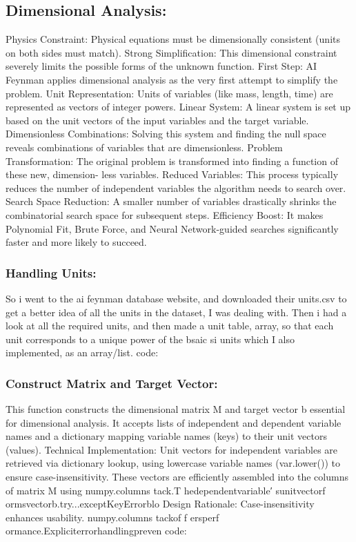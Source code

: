 \documentclass{article}
\begin{document}
\subsection{Dimensional Analysis: }

Physics Constraint: Physical equations must be dimensionally consistent (units on both sides must match).
Strong Simplification: This dimensional constraint severely limits the possible forms of the unknown function.
First Step: AI Feynman applies dimensional analysis as the very first attempt to simplify the problem.
Unit Representation: Units of variables (like mass, length, time) are represented as vectors of integer powers.
Linear System: A linear system is set up based on the unit vectors of the input variables and the target variable.
Dimensionless Combinations: Solving this system and finding the null space reveals combinations of variables
that are dimensionless.
Problem Transformation: The original problem is transformed into finding a function of these new, dimension-
less variables.
Reduced Variables: This process typically reduces the number of independent variables the algorithm needs to
search over.
Search Space Reduction: A smaller number of variables drastically shrinks the combinatorial search space for
subsequent steps.
Efficiency Boost: It makes Polynomial Fit, Brute Force, and Neural Network-guided searches significantly
faster and more likely to succeed. 


\subsubsection{Handling Units:}

So i went to the ai feynman database website, and downloaded their units.csv to get a better idea of all the units
in the dataset, I was dealing with. Then i had a look at all the required units, and then made a unit table, array,
so that each unit corresponds to a unique power of the bsaic si units which I also implemented, as an array/list.
code: \\


\subsubsection{Construct Matrix and Target Vector:}

This function constructs the dimensional matrix M and target vector b essential for dimensional analysis. It
accepts lists of independent and dependent variable names and a dictionary mapping variable names (keys) to
their unit vectors (values).
Technical Implementation: Unit vectors for independent variables are retrieved via dictionary lookup, using
lowercase variable names (var.lower()) to ensure case-insensitivity. These vectors are efficiently assembled into
the columns of matrix M using numpy.columns tack.T hedependentvariable′ sunitvectorf ormsvectorb.try...exceptKeyErrorblo
Design Rationale: Case-insensitivity enhances usability. numpy.columns tackof f ersperf ormance.Expliciterrorhandlingpreven
code:\\ 
\end{document}
